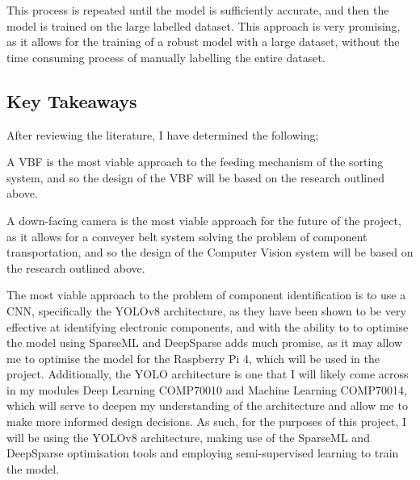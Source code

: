 This process is repeated until the model is sufficiently accurate, and then the model is trained on the large labelled dataset. This approach
is very promising, as it allows for the training of a robust model with a large dataset, without the time consuming process of manually labelling the entire dataset.

\subsection{Key Takeaways}
After reviewing the literature, I have determined the following;

A VBF is the most viable approach to the feeding mechanism of the sorting system, and so the design of the VBF will be based on the research outlined above.

A down-facing camera is the most viable approach for the future of the project, as it allows for a conveyer belt system solving the problem of component transportation, and so the design of the Computer Vision system will be based on the research outlined above.

The most viable approach to the problem of component identification is to use a CNN, specifically the YOLOv8 architecture, as they have been shown to be very effective at identifying electronic components, and with the ability to
to optimise the model using SparseML and DeepSparse adds much promise, as it may allow me to optimise the model for the Raspberry Pi 4, which will be used in the project. 
Additionally, the YOLO architecture is one that I will likely come across in my modules Deep Learning COMP70010 and Machine Learning COMP70014, which will serve
to deepen my understanding of the architecture and allow me to make more informed design decisions.
As such, for the purposes of this project, I will be using the YOLOv8 architecture, making use of the SparseML and DeepSparse optimisation tools and employing semi-supervised learning to train the model.

